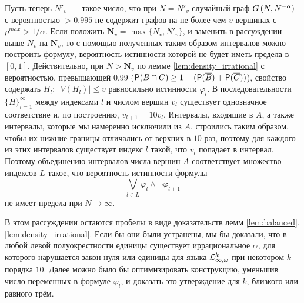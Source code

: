 Пусть теперь $N'_v$~--- такое число, что при $N = N'_v$ случайный граф $\Gna$ с вероятностью $>0.995$ не содержит графов на не более чем $v$ вершинах с $\rho^{max} > 1/\alpha$.
Если положить $\mathbf{N}_v = \max\{N_v, N'_v\}$, и заменить в рассуждении выше $N_v$ на $\mathbf{N}_v$, то с помощью полученных таким образом интервалов можно построить формулу, вероятность истинности которой не будет иметь предела в $[0,1]$.
Действительно, при $N > \mathbf{N}_v$ по лемме \ref{lem:density_irrational} с вероятностью, превышающей $0.99$ ($\P(B \cap C) \geq 1 - (\P(\overline B) + \P(\overline C))$), свойство содержать $H_l:~ |V(H_l)| \leq v$ равносильно истинности $\varphi_l$.
В последовательности $\{H\}_{l=1}^\infty$ между индексами $l$ и числом вершин $v_l$ существует однозначное соответствие и, по построению, $v_{l+1} = 10 v_l$.
Интервалы, входящие в $A$, а также интервалы, которые мы намеренно исключили из $A$, строились таким образом, чтобы их нижние границы отличались от верхних в $10$ раз, поэтому для каждого из этих интервалов существует индекс $l$ такой, что $v_l$ попадает в интервал.
Поэтому объединению интервалов числа вершин $A$ соответствует множество индексов $L$ такое, что вероятность истинности формулы \[
\bigvee_{l \in L} \varphi_l \wedge \neg \varphi_{l+1} 
\]
не имеет предела при $N \rightarrow \infty$.

В этом рассуждении остаются пробелы в виде доказательств лемм \ref{lem:balanced}, \ref{lem:density_irrational}.
Если бы они были устранены, мы бы доказали, что в любой левой полуокрестности единицы существует иррациональное $\alpha$, для которого нарушается закон нуля или единицы для языка $\LL^k_{\infty, \omega}$ при некотором $k$ порядка $10$.
Далее можно было бы оптимизировать конструкцию, уменьшив число переменных в формуле $\varphi_l$, и доказать это утверждение для $k$, близкого или равного трём.